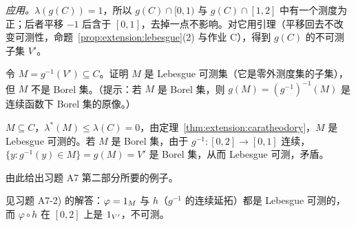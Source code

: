 \begin{probleme}
\begin{questions}
\begin{solution}
\emph{应用。}$\lambda(g(C))=1$，所以 $g(C)\cap[0,1)$ 与 $g(C)\cap[1,2]$ 中有一个测度为正；后者平移 $-1$ 后含于 $[0,1]$，去掉一点不影响。对它用引理（平移回去不改变可测性，命题~\ref{prop:extension:lebesgue}(2) 与作业 C），得到 $g(C)$ 的不可测子集 $V'$。
\end{solution}
\item 令 $M=g^{-1}(V')\subseteq C$。证明 $M$ 是 Lebesgue 可测集（它是零外测度集的子集），但 $M$ 不是 Borel 集。（提示：若 $M$ 是 Borel 集，则 $g(M)=(g^{-1})^{-1}(M)$ 是连续函数下 Borel 集的原像。）
\begin{solution}
$M\subseteq C$，$\lambda^*(M)\leqslant\lambda(C)=0$，由定理~\ref{thm:extension:caratheodory}，$M$ 是 Lebesgue 可测的。若 $M$ 是 Borel 集，由于 $g^{-1}:[0,2]\to[0,1]$ 连续，$\{y:g^{-1}(y)\in M\}=g(M)=V'$ 是 Borel 集，从而 Lebesgue 可测，矛盾。
\end{solution}
\item 由此给出习题 A7 第二部分所要的例子。
\begin{solution}
见习题 A7-2) 的解答：$\varphi=1_M$ 与 $h$（$g^{-1}$ 的连续延拓）都是 Lebesgue 可测的，而 $\varphi\circ h$ 在 $[0,2]$ 上是 $1_{V'}$，不可测。
\end{solution}
\end{questions}
\end{probleme}


